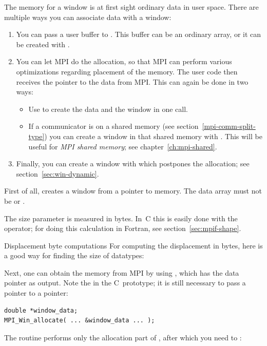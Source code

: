 The memory for a window is at first sight ordinary data in user space. There are multiple
ways you can associate data with a window:
\begin{enumerate}
\item You can pass a user buffer to
  . This buffer can be an ordinary array,
  or it can be created with .
\item You can let MPI do the allocation, so that MPI can perform various
  optimizations regarding placement of the memory. The user code then
  receives the pointer to the data from MPI. This can again be done in two ways:
  \begin{itemize}
  \item Use  to create the data and the
    window in one call.
  \item If a communicator is on a shared memory (see
    section~\ref{mpi-comm-split-type}) you can create a window in that
    shared memory with .
    This will be useful for
    \emph{MPI shared memory};
    see chapter~\ref{ch:mpi-shared}.
  \end{itemize}
\item Finally, you can create a window with
   which postpones the allocation;
  see section~\ref{sec:win-dynamic}.
\end{enumerate}

First of all, 
creates a window from a pointer to memory.
The data array must not be  or .

The size parameter is measured in bytes. In~C this is easily done
with the  operator;
%
%
for doing this calculation in Fortran, see section~\ref{sec:mpif-shape}.

\begin{pythonnote}{Displacement byte computations}
  For computing the displacement in bytes,
  here is a good way for finding the size of  datatypes:
\end{pythonnote}

Next, one can obtain the memory from MPI by using
,
which has the data pointer as output. Note the  in the
C~prototype; it is still necessary to pass a pointer to a pointer:
\lstset{style=reviewcode,language=C}
\begin{lstlisting}
double *window_data;
MPI_Win_allocate( ... &window_data ... );
\end{lstlisting}
The routine  performs only the allocation
part of , after which you need to
:

